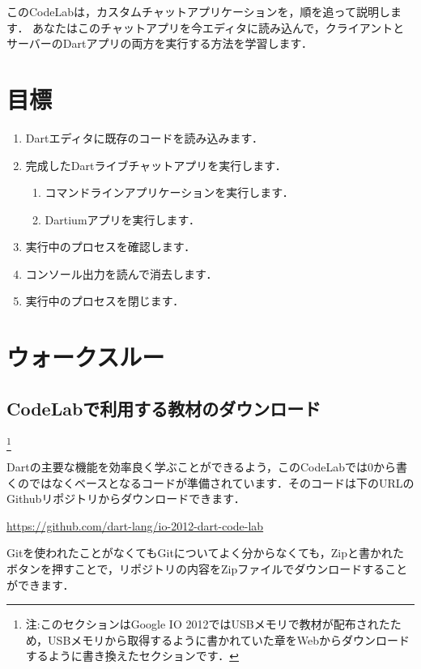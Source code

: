 
このCodeLabは，カスタムチャットアプリケーションを，順を追って説明します．
あなたはこのチャットアプリを今エディタに読み込んで，クライアントとサーバーのDartアプリの両方を実行する方法を学習します．

\section{目標}

\begin{enumerate}
\item Dartエディタに既存のコードを読み込みます．
\item 完成したDartライブチャットアプリを実行します．
\begin{enumerate}
\item コマンドラインアプリケーションを実行します．
\item Dartiumアプリを実行します．
\end{enumerate}
\item 実行中のプロセスを確認します．
\item コンソール出力を読んで消去します．
\item 実行中のプロセスを閉じます．
\end{enumerate}

\section{ウォークスルー}

\subsection{CodeLabで利用する教材のダウンロード}\footnote{注:このセクションはGoogle IO 2012ではUSBメモリで教材が配布されたため，USBメモリから取得するように書かれていた章をWebからダウンロードするように書き換えたセクションです．}

Dartの主要な機能を効率良く学ぶことができるよう，このCodeLabでは0から書くのではなくベースとなるコードが準備されています．そのコードは下のURLのGithubリポジトリからダウンロードできます．

\vspace{5mm}
\url{https://github.com/dart-lang/io-2012-dart-code-lab}
\vspace{5mm}

Gitを使われたことがなくてもGitについてよく分からなくても，Zipと書かれたボタンを押すことで，リポジトリの内容をZipファイルでダウンロードすることができます．

